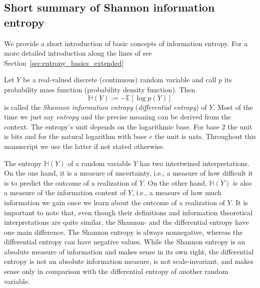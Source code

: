 \documentclass[smallextended]{svjour3}
\newcommand{\E}{\mathbb{E}}
\renewcommand{\H}{\mathbb{H}}
\newcommand{\bits}{\mathrm{bits}}
\newcommand{\nats}{\mathrm{nats}}
\newcommand{\ie}{i.e.}
\newcommand{\pdf}{probability density function}
\begin{document}
\subsection{Short summary of Shannon information entropy}
\label{sec:entropy_basics}

We provide a short introduction of basic concepts of information entropy.
For a more detailed introduction along the lines of \citet{Cover2006} see Section~\ref{sec:entropy_basics_extended}

Let $Y$ be a real-valued discrete (continuous) random variable and call $p$ its probability mass function (\pdf).
Then
\begin{equation*}
  \H(Y) := -\E\left[\log p(Y)\right]
\end{equation*}
is called the \emph{Shannon information entropy} (\emph{differential entropy}) of $Y$.
Most of the time we just say \emph{entropy} and the precise meaning can be derived from the context.
The entropy's unit depends on the logarithmic base.
For base $2$ the unit is \emph{$\bits$} and for the natural logarithm with base $e$ the unit is \emph{$\nats$}.
Throughout this manuscript we use the latter if not stated otherwise.

The entropy $\H(Y)$ of a random variable $Y$ has two intertwined interpretations.
On the one hand, it is a measure of uncertainty, \ie, a measure of how difficult it is to predict the outcome of a realization of $Y$.
On the other hand, $\H(Y)$ is also a measure of the information content of $Y$, \ie, a measure of how much information we gain once we learn about the outcome of a realization of $Y$.
It is important to note that, even though their definitions and information theoretical interpretations are quite similar, the Shannon- and the differential entropy have one main difference.
The Shannon entropy is always nonnegative, whereas the differential entropy can have negative values.
While the Shannon entropy is an absolute measure of information and makes sense in its own right, the differential entropy is not an absolute information measure, is not scale-invariant, and makes sense only in comparison with the differential entropy of another random variable.
\end{document}
